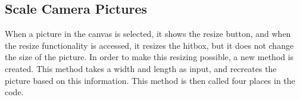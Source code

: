 \subsection{Scale Camera Pictures}
When a picture in the canvas is selected, it shows the resize button, and when the resize functionality is accessed, it resizes the hitbox, but it does not change the size of the picture. In order to make this resizing possible, a new method is created. This method takes a width and length as input, and recreates the picture based on this information. This method is then called four places in the code. 